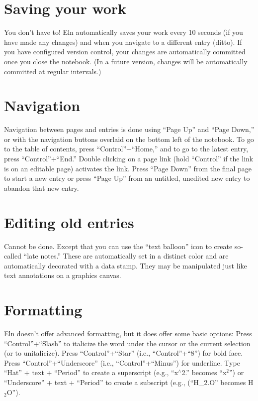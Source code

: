 \documentclass[11pt]{report}
\begin{document}
\section{Saving your work}

You don't have to! Eln automatically saves your work every 10 seconds
(if you have made any changes) and when you navigate to a different
entry (ditto). If you have configured version control, your changes
are automatically committed once you close the notebook. (In a future
version, changes will be automatically committed at regular
intervals.)

\section{Navigation}

Navigation between pages and entries is done using ``Page Up'' and
``Page Down,'' or with the navigation buttons overlaid on the bottom left of
the notebook. To go to the table of contents, press
``Control''+``Home,'' and to go to the latest entry, press
``Control''+``End.'' Double clicking on a page link (hold ``Control''
if the link is on an editable page) activates the link. Press ``Page
Down'' from the final page to start a new entry or press ``Page Up''
from an untitled, unedited new entry to abandon that new entry.

\section{Editing old entries}

Cannot be done. Except that you can use the ``text balloon'' icon to
create so-called ``late notes.'' These are automatically set in a
distinct color and are automatically decorated with a data stamp. They
may be manipulated just like text annotations on a graphics canvas.

\section{Formatting}

Eln doesn't offer advanced formatting, but it does offer some basic
options: Press ``Control''+``Slash'' to italicize the word under the
cursor or the current selection (or to unitalicize). Press
``Control''+``Star'' (i.e., ``Control''+``8'') for bold face. Press
``Control''+``Underscore'' (i.e., ``Control''+``Minus'') for
underline. Type ``Hat'' + text + ``Period'' to create a superscript
(e.g., ``x$^\wedge$2.'' becomes ``x$^2$'') or ``Underscore'' + text +
``Period'' to create a subscript (e.g., (``H\_2.O'' becomes H$_2$O'').
\end{document}
